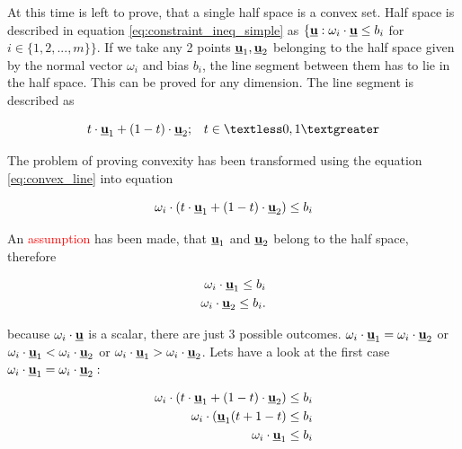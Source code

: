 \documentclass{article}
\begin{document}
At this time is left to prove, that a single half space is a convex set. Half space is described in equation \ref{eq:constraint_ineq_simple} as $\{\textbf{\underline{u}} : \omega_i \cdot \textbf{\underline{u}} \leq b_i$ for $i \in \{1, 2, ..., m\}\}$. If we take any 2 points $\textbf{\underline{u}}_1, \textbf{\underline{u}}_2$ belonging to the half space given by the normal vector $\omega_i$ and bias $b_i$, the line segment between them has to lie in the half space. This can be proved for any dimension. The line segment is described as

\begin{equation}
\label{eq:convex_line}
t \cdot \textbf{\underline{u}}_1 + (1-t) \cdot \textbf{\underline{u}}_2; \;\;\; t \in \textless 0, 1 \textgreater
\end{equation}

The problem of proving convexity has been transformed using the equation \ref{eq:convex_line} into equation 

\begin{equation}
\label{eq:convex_u_proof}
\omega_i \cdot (t \cdot \textbf{\underline{u}}_1 + (1-t) \cdot \textbf{\underline{u}}_2) \leq b_i
\end{equation}


An \textcolor{red}{assumption} has been made, that $\textbf{\underline{u}}_1$ and $\textbf{\underline{u}}_2$ belong to the half space, therefore 

\begin{equation}
\begin{split}
\omega_i \cdot \textbf{\underline{u}}_1 \leq b_i\\
\omega_i \cdot \textbf{\underline{u}}_2 \leq b_i.
\end{split}
\end{equation}

because $\omega_i \cdot \textbf{\underline{u}}$ is a scalar, there are just 3 possible outcomes. $\omega_i \cdot \textbf{\underline{u}}_1 = \omega_i \cdot \textbf{\underline{u}}_2$ or $\omega_i \cdot \textbf{\underline{u}}_1 < \omega_i \cdot \textbf{\underline{u}}_2$ or $\omega_i \cdot \textbf{\underline{u}}_1 > \omega_i \cdot \textbf{\underline{u}}_2$. Lets have a look at the first case $\omega_i \cdot \textbf{\underline{u}}_1 = \omega_i \cdot \textbf{\underline{u}}_2:$


\begin{equation}
\begin{split}
\omega_i \cdot (t \cdot \textbf{\underline{u}}_1 + (1-t) \cdot \textbf{\underline{u}}_2) \leq b_i\\
\omega_i \cdot (\textbf{\underline{u}}_1(t+1-t) \leq b_i\\
\omega_i \cdot \textbf{\underline{u}}_1 \leq b_i
\end{split}
\end{equation}
\end{document}
